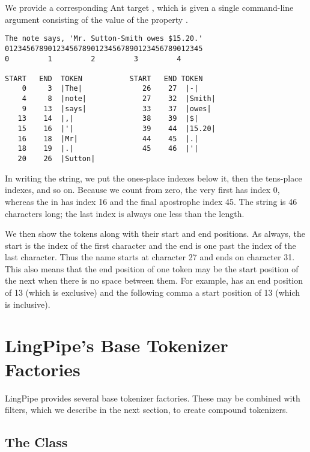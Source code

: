We provide a corresponding Ant target , which
is given a single command-line argument consisting of the value of
the property .  
%
\begin{verbatim}
The note says, 'Mr. Sutton-Smith owes $15.20.'
0123456789012345678901234567890123456789012345
0         1         2         3         4

START   END  TOKEN           START   END TOKEN
    0     3  |The|              26    27  |-|
    4     8  |note|             27    32  |Smith|
    9    13  |says|             33    37  |owes|
   13    14  |,|                38    39  |$|
   15    16  |'|                39    44  |15.20|
   16    18  |Mr|               44    45  |.|
   18    19  |.|                45    46  |'|
   20    26  |Sutton|
\end{verbatim}
%
In writing the string, we put the ones-place indexes below it, then
the tens-place indexes, and so on.  Because we count from zero, the
very first  has index 0, whereas the  in
 has index 16 and the final apostrophe index 45.
The string is 46 characters long; the last index is always one less
than the length.

We then show the tokens along with their start and end positions.  As
always, the start is the index of the first character and the end is
one past the index of the last character.  Thus the name
 starts at character 27 and ends on character 31.
This also means that the end position of one token may be the start
position of the next when there is no space between them.  For
example,  has an end position of 13 (which is
exclusive) and the following comma a start position of 13 (which is
inclusive).  


\section{LingPipe's Base Tokenizer Factories}

LingPipe provides several base tokenizer factories.  These may be combined
with filters, which we describe in the next section, to create compound
tokenizers.

\subsection{The  Class}

